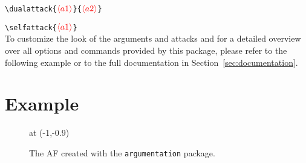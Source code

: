\documentclass[headings=normal]{scrartcl}
\newcommand{\argumentation}{\texttt{argumentation}\xspace}
\newcommand{\opt}[2][red]{\ensuremath{\textcolor{#1}{\langle #2\rangle}}}
\begin{document}
\vspace{-0.3cm}
\verb|\dualattack{|\opt{a1}\verb|}{|\opt{a2}\verb|}|

\verb|\selfattack{|\opt{a1}\verb|}|\\

\noindent
To customize the look of the arguments and attacks and for a detailed overview over all options and commands provided by this package, please refer to the following example or to the full documentation in Section~\ref{sec:documentation}.

\newpage\section{Example}\label{sec:example}

\begin{figure}[ht]
    \centering
    \begin{af}


         at (-1,-0.9)

        

        \label{af:ex1}
    \end{af}
    \caption{The AF  created with the \argumentation package.}
    \label{fig:example}
\end{figure}
\end{document}
